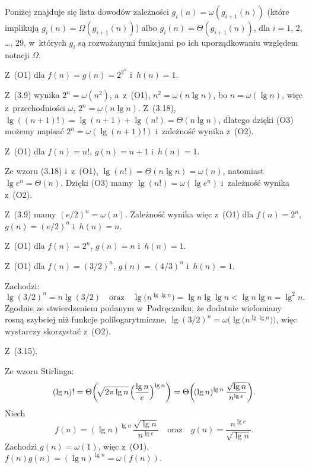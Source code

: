 Poniżej znajduje się lista dowodów zależności $g_i(n)=\omega(g_{i+1}(n))$ (które implikują $g_i(n)=\Omega(g_{i+1}(n))$) albo $g_i(n)=\Theta(g_{i+1}(n))$, dla $i=1$, 2, \dots, 29, w~których $g_i$ są rozważanymi funkcjami po ich uporządkowaniu względem notacji $\Omega$.
\begin{description}[font=\textnormal, topsep=2ex, itemsep=2ex]
	\item[$2^{2^{n+1}}=\omega\bigl(2^{2^n}\bigr)$:]
	Z~(O1) dla $f(n)=g(n)=2^{2^n}$ i~$h(n)=1$.
	\item[$2^{2^n}=\omega((n+1)!)$:]
	Z~(3.9) wynika $2^n=\omega(n^2)$, a~z~(O1), $n^2=\omega(n\lg n)$, bo $n=\omega(\lg n)$, więc z~przechodniości $\omega$, $2^n=\omega(n\lg n)$.
	Z~(3.18), $\lg((n+1)!)=\lg(n+1)+\lg(n!)=\Theta(n\lg n)$, dlatego dzięki (O3) możemy napisać $2^n=\omega(\lg(n+1)!)$ i~zależność wynika z~(O2).
	\item[$(n+1)!=\omega(n!)$:]
	Z~(O1) dla $f(n)=n!$, $g(n)=n+1$ i~$h(n)=1$.
	\item[$n!=\omega(e^n)$:]
	Ze wzoru (3.18) i~z~(O1), $\lg(n!)=\Theta(n\lg n)=\omega(n)$, natomiast $\lg e^n=\Theta(n)$.
	Dzięki (O3) mamy $\lg(n!)=\omega(\lg e^n)$ i~zależność wynika z~(O2).
	\item[$e^n=\omega(n\cdot2^n)$:]
	Z~(3.9) mamy $(e/2)^n=\omega(n)$.
	Zależność wynika więc z~(O1) dla $f(n)=2^n$, $g(n)=(e/2)^n$ i~$h(n)=n$.
	\item[$n\cdot2^n=\omega(2^n)$:]
	Z~(O1) dla $f(n)=2^n$, $g(n)=n$ i~$h(n)=1$.
	\item[$2^n=\omega((3/2)^n)$:]
	Z~(O1) dla $f(n)=(3/2)^n$, $g(n)=(4/3)^n$ i~$h(n)=1$.
	\item[$(3/2)^n=\omega\bigl(n^{\lg\lg n}\bigr)$:]
	Zachodzi:
	\[
		\lg(3/2)^n = n\lg(3/2) \quad\text{oraz}\quad \lg\bigl(n^{\lg\lg n}\bigr) = \lg n\lg\lg n < \lg n\lg n = \lg^2n.
	\]
	Zgodnie ze stwierdzeniem podanym w~Podręczniku, że dodatnie wielomiany rosną szybciej niż funkcje polilogarytmiczne, $\lg(3/2)^n=\omega\bigr(\!\lg\bigl(n^{\lg\lg n}\bigr)\bigl)$, więc wystarczy skorzystać z~(O2).
	\item[$n^{\lg\lg n}=\Theta\bigl((\lg n)^{\lg n}\bigr)$:]
	Z~(3.15).
	\item[$(\lg n)^{\lg n}=\omega((\lg n)!)$:]
	Ze wzoru Stirlinga:
	\[
		(\lg n)! = \Theta\biggl(\!\sqrt{2\pi\lg n}\,\Bigl(\frac{\lg n}{e}\Bigr)^{\lg n}\biggr) = \Theta\biggl(\!(\lg n)^{\lg n}\,\frac{\sqrt{\lg n}}{n^{\lg e}}\biggr).
	\]
	Niech
	\[
		f(n) = (\lg n)^{\lg n}\,\frac{\sqrt{\lg n}}{n^{\lg e}} \quad\text{oraz}\quad g(n) = \frac{n^{\lg e}}{\sqrt{\lg n}}.
	\]
	Zachodzi $g(n)=\omega(1)$, więc z~(O1), $f(n)g(n)=(\lg n)^{\lg n}=\omega(f(n))$.

\end{description}
